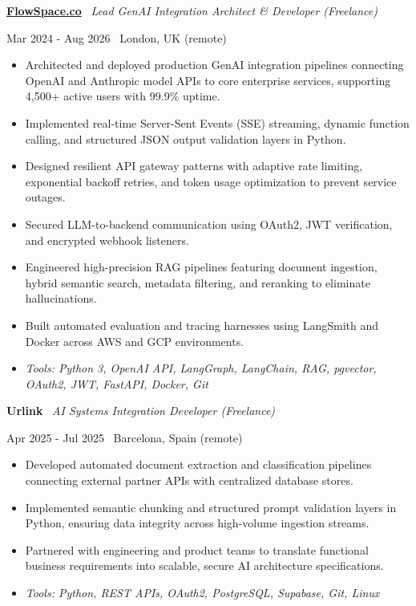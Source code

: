 \documentclass[a4paper,10pt]{article}
\newcommand{\role}[4]{%
  \vspace{2pt}\noindent
  \begin{minipage}[t]{0.70\textwidth}\raggedright\textbf{#1} \textbullet\ \textit{#3}\end{minipage}%
  \hfill
  \begin{minipage}[t]{0.28\textwidth}\raggedleft\footnotesize\color{gray}#2 \textbullet\ #4\end{minipage}%
  \vspace{1pt}%
}
\begin{document}
\role{\href{https://flowspace.co}{FlowSpace.co}}{Mar 2024 - Aug 2026}{Lead GenAI Integration Architect \& Developer (Freelance)}{London, UK (remote)}
\begin{itemize}
  \item Architected and deployed production GenAI integration pipelines connecting OpenAI and Anthropic model APIs to core enterprise services, supporting 4,500+ active users with 99.9\% uptime.
  \item Implemented real-time Server-Sent Events (SSE) streaming, dynamic function calling, and structured JSON output validation layers in Python.
  \item Designed resilient API gateway patterns with adaptive rate limiting, exponential backoff retries, and token usage optimization to prevent service outages.
  \item Secured LLM-to-backend communication using OAuth2, JWT verification, and encrypted webhook listeners.
  \item Engineered high-precision RAG pipelines featuring document ingestion, hybrid semantic search, metadata filtering, and reranking to eliminate hallucinations.
  \item Built automated evaluation and tracing harnesses using LangSmith and Docker across AWS and GCP environments.
  \item \textit{Tools: Python 3, OpenAI API, LangGraph, LangChain, RAG, pgvector, OAuth2, JWT, FastAPI, Docker, Git}
\end{itemize}

\role{Urlink}{Apr 2025 - Jul 2025}{AI Systems Integration Developer (Freelance)}{Barcelona, Spain (remote)}
\begin{itemize}
  \item Developed automated document extraction and classification pipelines connecting external partner APIs with centralized database stores.
  \item Implemented semantic chunking and structured prompt validation layers in Python, ensuring data integrity across high-volume ingestion streams.
  \item Partnered with engineering and product teams to translate functional business requirements into scalable, secure AI architecture specifications.
  \item \textit{Tools: Python, REST APIs, OAuth2, PostgreSQL, Supabase, Git, Linux}
\end{itemize}
\end{document}
